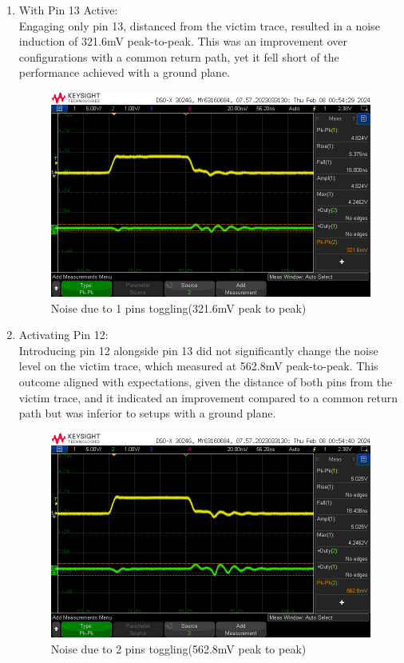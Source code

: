 \documentclass[a4paper,11pt]{article}%
\begin{document}
\begin{enumerate}
	\item With Pin 13 Active:\\ Engaging only pin 13, distanced from the victim trace, resulted in a noise induction of 321.6mV peak-to-peak. This was an improvement over configurations with a common return path, yet it fell short of the performance achieved with a ground plane.
	\begin{figure}[H]
		\centering
		\includegraphics[scale=0.5]{figures/noise_np__sr1.png}
		\caption{Noise due to 1 pins toggling(321.6mV peak to peak)}
		\label{noise_np__sr1}
	\end{figure}

	\item Activating Pin 12:\\ Introducing pin 12 alongside pin 13 did not significantly change the noise level on the victim trace, which measured at 562.8mV peak-to-peak. This outcome aligned with expectations, given the distance of both pins from the victim trace, and it indicated an improvement compared to a common return path but was inferior to setups with a ground plane.
	\begin{figure}[H]
		\centering
		\includegraphics[scale=0.5]{figures/noise_np__sr2.png}
		\caption{Noise due to 2 pins toggling(562.8mV peak to peak)}
		\label{noise_np__sr2}
	\end{figure}
	

\end{enumerate}
\end{document}
